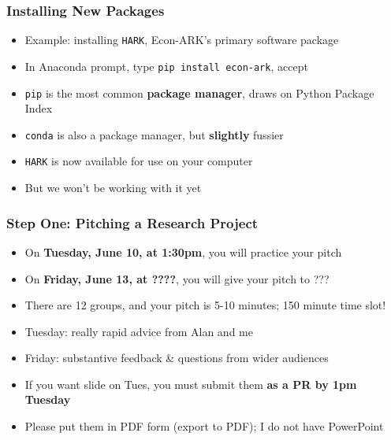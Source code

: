 \documentclass[aspectratio=169, handout]{beamer}
\begin{document}

\begin{frame}
\frametitle{Installing New Packages}
\begin{itemize}
	\item Example: installing \texttt{HARK}, Econ-ARK's primary software package
	
	\item In Anaconda prompt, type \texttt{pip install econ-ark}, accept
	
	\item <2->\texttt{pip} is the most common \textbf{package manager}, draws on Python Package Index
	
	\item <2->\texttt{conda} is also a package manager, but \textbf{slightly} fussier
	
	\item <3->\texttt{HARK} is now available for use on your computer
	
	\item <3->But we won't be working with it yet
\end{itemize}
\end{frame}



\begin{frame}
\frametitle{Step One: Pitching a Research Project}

\begin{itemize}
	\item On \textbf{Tuesday, June 10, at 1:30pm}, you will practice your pitch
	
	\item On \textbf{Friday, June 13, at ????}, you will give your pitch to ???
	
	\item <2->There are 12 groups, and your pitch is 5-10 minutes; 150 minute time slot!
	
	\item <2->Tuesday: really rapid advice from Alan and me
	
	\item <2->Friday: substantive feedback \& questions from wider audiences
	
	\item <3->If you want slide on Tues, you must submit them \textbf{as a PR by 1pm Tuesday}
	
	\item <3->Please put them in PDF form (export to PDF); I do not have PowerPoint
\end{itemize}
\end{frame}
\end{document}
